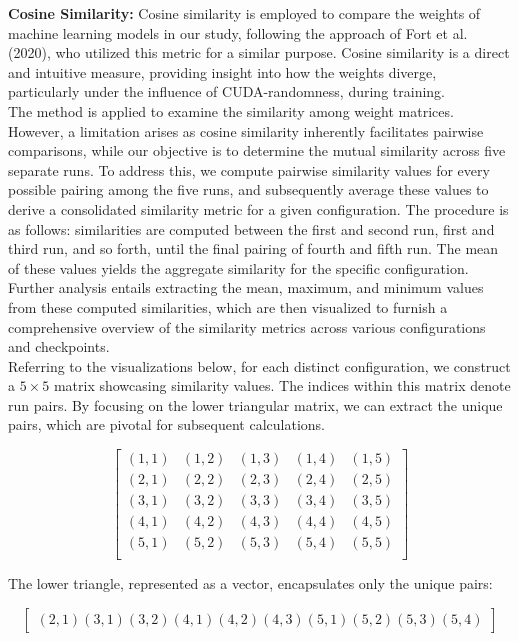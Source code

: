 \textbf{Cosine Similarity:} 
Cosine similarity is employed to compare the weights of machine learning models in our study, following the approach of Fort et al. (2020), who utilized this metric for a similar purpose. Cosine similarity is a direct and intuitive measure, providing insight into how the weights diverge, particularly under the influence of CUDA-randomness, during training.\\

The method is applied to examine the similarity among weight matrices. However, a limitation arises as cosine similarity inherently facilitates pairwise comparisons, while our objective is to determine the mutual similarity across five separate runs. To address this, we compute pairwise similarity values for every possible pairing among the five runs, and subsequently average these values to derive a consolidated similarity metric for a given configuration. The procedure is as follows: similarities are computed between the first and second run, first and third run, and so forth, until the final pairing of fourth and fifth run. The mean of these values yields the aggregate similarity for the specific configuration. Further analysis entails extracting the mean, maximum, and minimum values from these computed similarities, which are then visualized to furnish a comprehensive overview of the similarity metrics across various configurations and checkpoints.\\

Referring to the visualizations below, for each distinct configuration, we construct a \(5 \times 5\) matrix showcasing similarity values. The indices within this matrix denote run pairs. By focusing on the lower triangular matrix, we can extract the unique pairs, which are pivotal for subsequent calculations.

\[
\begin{bmatrix}
    (1,1) & (1,2) & (1,3) & (1,4) & (1,5) \\
    (2,1) & (2,2) & (2,3) & (2,4) & (2,5) \\
    (3,1) & (3,2) & (3,3) & (3,4) & (3,5) \\
    (4,1) & (4,2) & (4,3) & (4,4) & (4,5) \\
    (5,1) & (5,2) & (5,3) & (5,4) & (5,5) \\
\end{bmatrix}
\]

The lower triangle, represented as a vector, encapsulates only the unique pairs:

\[
\begin{bmatrix}
    (2,1) 
    (3,1) 
    (3,2) 
    (4,1) 
    (4,2) 
    (4,3) 
    (5,1) 
    (5,2) 
    (5,3) 
    (5,4) 
\end{bmatrix}
\]

